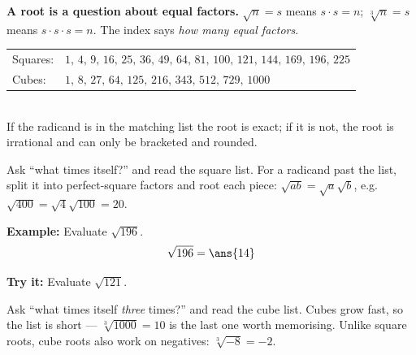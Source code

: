 \documentclass[12pt]{article}
\begin{document}

\begin{formulabox}
\textbf{A root is a question about equal factors.}
$\sqrt{n} = s$ means $s \cdot s = n$; \; $\sqrt[3]{n} = s$ means
$s \cdot s \cdot s = n$. The index says \emph{how many equal factors}.\\[3pt]
\begin{tabular}{@{}ll@{}}
Squares: & $1,\,4,\,9,\,16,\,25,\,36,\,49,\,64,\,81,\,100,\,121,\,144,\,169,\,196,\,225$ \\
Cubes: & $1,\,8,\,27,\,64,\,125,\,216,\,343,\,512,\,729,\,1000$ \\
\end{tabular}\\[3pt]
If the radicand is in the matching list the root is exact; if it is not, the
root is irrational and can only be bracketed and rounded.
\end{formulabox}


\begin{formulabox}
Ask ``what times itself?'' and read the square list. For a radicand past the
list, split it into perfect-square factors and root each piece:
$\sqrt{ab} = \sqrt{a}\sqrt{b}$, e.g. $\sqrt{400} = \sqrt{4}\sqrt{100} = 20$.
\end{formulabox}

\begin{examplebox}
\textbf{Example:} Evaluate $\sqrt{196}$.
\[ \sqrt{196} = \ans{14} \]
\end{examplebox}

\begin{tryitbox}
\textbf{Try it:} Evaluate $\sqrt{121}$.\\[2pt]
\end{tryitbox}


\begin{formulabox}
Ask ``what times itself \emph{three} times?'' and read the cube list. Cubes grow
fast, so the list is short --- $\sqrt[3]{1000} = 10$ is the last one worth
memorising. Unlike square roots, cube roots also work on negatives:
$\sqrt[3]{-8} = -2$.
\end{formulabox}
\end{document}
